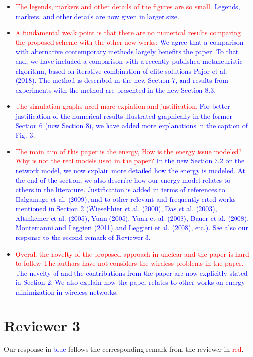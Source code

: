 \documentclass[12pt]{article}
\begin{document}
\begin{itemize}
{Done.
}
\item \textcolor{red}{The legends, markers and other details of the figures are so small.} \textcolor{blue}{
Legends, markers, and other details are now given in larger size.
}
\item \textcolor{red}{A fundamental weak point is that there are no numerical results comparing the proposed scheme with the other new works;} \textcolor{blue}{
We agree that a comparison with alternative contemporary methods largely benefits the paper.
To that end, we have included a comparison with a recently published metaheuristic algorithm, based on iterative combination of elite solutions Pajor et al. (2018).
The method is described in the new Section 7, and results from experiments with the method are presented in the new Section 8.3.
}
\item \textcolor{red}{The simulation graphs need more expiation and justification.} \textcolor{blue}{
For better justification of the numerical results illustrated graphically in the former Section 6 (now Section 8),
we have added more explanations in the caption of Fig. 3.
}
\item \textcolor{red}{ The main aim of this paper is the energy, How is the energy issue modeled? Why is not the real models used in the paper?} \textcolor{blue}{
In the new Section 3.2 on the network model, we now explain more detailed how the energy is modeled.
At the end of the section, we also describe how our energy model relates to others in the literature.
Justification is added in terms of references to  Halgamuge et al. (2009), 
and to other relevant and frequently cited works mentioned in Section 2 (Wieselthier et al. (2000), Das et al. (2003), Altinkemer et al. (2005),
Yuan (2005), Yuan et al. (2008), Bauer et al. (2008), Montemanni and Leggieri (2011) and Leggieri et al. (2008), etc.).
See also our response to the second remark of Reviewer 3.
}
\item \textcolor{red}{Overall the novelty of the proposed approach in unclear and the paper is hard to follow
The authors have not considers the wireless problems in the paper.} \textcolor{blue}{
The novelty of and the contributions from the paper are now explicitly stated in Section 2.
We also explain how the paper relates to other works on energy minimization in wireless networks.
}
\end{itemize}

\section*{Reviewer 3}
Our response in \textcolor{blue}{blue} follows the corresponding remark from the reviewer in \textcolor{red}{red}.
\end{document}

